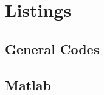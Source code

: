 \section{Listings}
\label{sec:Listings}

\subsection{General Codes}


%

\subsection{Matlab}
\label{subsec:Mathematica}

%